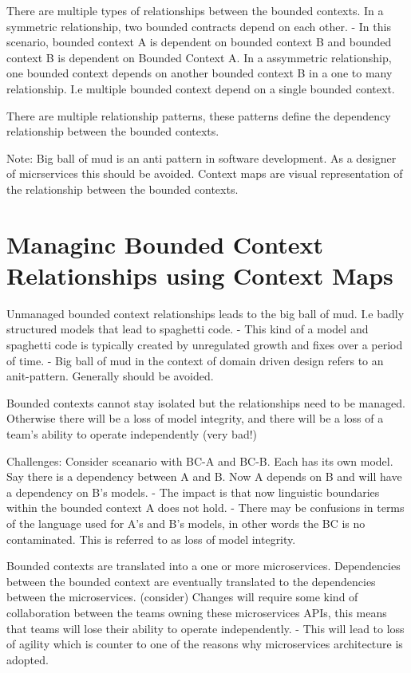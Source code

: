\documentclass[a4paper, 11pt]{book}
\begin{document}
    There are multiple types of relationships between the bounded contexts.
    In a symmetric relationship, two bounded contracts depend on each other.
    - In this scenario, bounded context A is dependent on bounded context B and bounded context B is dependent on Bounded Context A.
    In a assymmetric relationship, one bounded context depends on another bounded context B in a one to many relationship. I.e multiple bounded context depend on a single bounded context.

    There are multiple relationship patterns, these patterns define the dependency relationship between the bounded contexts.

    Note:
    Big ball of mud is an anti pattern in software development. As a designer of micrservices this should be avoided.
    Context maps are visual representation of the relationship between the bounded contexts.


    \section{Managinc Bounded Context Relationships using Context Maps}
    Unmanaged bounded context relationships leads to the big ball of mud. I.e badly structured models that lead to spaghetti code.
    - This kind of a model and spaghetti code is typically created by unregulated growth and fixes over a period of time.
    - Big ball of mud in the context of domain driven design refers to an anit-pattern. Generally should be avoided.

    Bounded contexts cannot stay isolated but the relationships need to be managed.
    Otherwise there will be a loss of model integrity, and there will be a loss of a team's ability to operate independently (very bad!)

    Challenges:
    Consider sceanario with BC-A and BC-B. Each has its own model.
    Say there is a dependency between A and B. Now A depends on B and will have a dependency on B's models.
    - The impact is that now linguistic boundaries within the bounded context A does not hold.
    - There may be confusions in terms of the language used for A's and B's models, in other words the BC is no contaminated. This is referred to as loss of model integrity.

    Bounded contexts are translated into a one or more microservices.
    Dependencies between the bounded context are eventually translated to the dependencies between the microservices. (consider)
    Changes will require some kind of collaboration between the teams owning these microservices APIs, this means that teams will lose their ability to operate independently.
    - This will lead to loss of agility which is counter to one of the reasons why microservices architecture is adopted.
\end{document}
